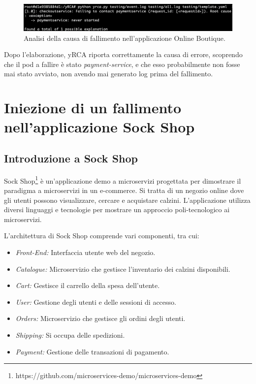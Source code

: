 \begin{figure}[h]
    \centering
    \includegraphics[width=\textwidth]{immagini/capitolo5/paymentservice_neverstarted.png}
    \caption{Analisi della causa di fallimento nell'applicazione Online Boutique.}
    \label{fig:paymentservice_unreachable}
\end{figure}

Dopo l'elaborazione, yRCA riporta correttamente la causa di errore, scoprendo che il pod a fallire è stato \textit{payment-service}, e che esso probabilmente non fosse mai stato avviato, non avendo mai generato log prima del fallimento.


\section{Iniezione di un fallimento nell'applicazione Sock Shop}

\subsection{Introduzione a Sock Shop}
Sock Shop\footnote{https://github.com/microservices-demo/microservices-demo} è un'applicazione demo a microservizi progettata per dimostrare il paradigma a microservizi in un e-commerce. Si tratta di un negozio online dove gli utenti possono visualizzare, cercare e acquistare calzini. L'applicazione utilizza diversi linguaggi e tecnologie per mostrare un approccio poli-tecnologico ai microservizi. 

L'architettura di Sock Shop comprende vari componenti, tra cui:

\begin{itemize}
    \item \textit{Front-End:} Interfaccia utente web del negozio.
    \item \textit{Catalogue:} Microservizio che gestisce l'inventario dei calzini disponibili.
    \item \textit{Cart:} Gestisce il carrello della spesa dell'utente.
    \item \textit{User:} Gestione degli utenti e delle sessioni di accesso.
    \item \textit{Orders:} Microservizio che gestisce gli ordini degli utenti.
    \item \textit{Shipping:} Si occupa delle spedizioni.
    \item \textit{Payment:} Gestione delle transazioni di pagamento.
\end{itemize}

